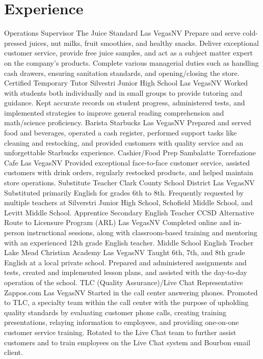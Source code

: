 \documentclass[11pt]{moderncv}
\title{}
\begin{document}
\maketitle
\section{Experience}
			{Operations Supervisor}
			{The Juice Standard}
			{Las Vegas}{NV}
			{Prepare and serve cold-pressed juices, nut milks, fruit smoothies, and healthy snacks. Deliver exceptional customer service, provide free juice samples, and act as a subject matter expert on the company's products. Complete various managerial duties such as handling cash drawers, ensuring sanitation standards, and opening/closing the store.}
			{Certified Temporary Tutor}
			{Silvestri Junior High School}
			{Las Vegas}{NV}
			{Worked with students both individually and in small groups to provide tutoring and guidance. Kept accurate records on student progress, administered tests, and implemented strategies to improve general reading comprehension and math/science proficiency.}
			{Barista}
			{Starbucks}
			{Las Vegas}{NV}
			{Prepared and served food and beverages, operated a cash register, performed support tasks like cleaning and restocking, and provided customers with quality service and an unforgettable Starbucks experience.}
			{Cashier/Food Prep}
			{Sambalatte Torrefazione Cafe}
			{Las Vegas}{NV}
			{Provided  exceptional face-to-face  customer service, assisted customers with drink orders, regularly restocked products, and helped maintain store operations.}
			{Substitute Teacher}
			{Clark County School District}
			{Las Vegas}{NV}
			{Substituted primarily English for grades 6th to 8th. Frequently requested by multiple teachers at Silverstri Junior High School, Schofield Middle School, and Levitt Middle School.}
			{Apprentice Secondary English Teacher}
			{CCSD Alternative Route to Licensure Program (ARL)}
			{Las Vegas}{NV}
			{Completed online and in-person instructional sessions, along with classroom-based training and mentoring with an experienced 12th grade English teacher.}
			{Middle School English Teacher}
			{Lake Mead Christian Academy}
			{Las Vegas}{NV}
			{Taught 6th, 7th, and 8th grade English at a local private school. Prepared and administered assignments and tests, created and implemented lesson plans, and assisted with the day-to-day operation of the school.}
			{TLC (Quality Assurance)/Live Chat Representative}
			{Zappos.com}
			{Las Vegas}{NV}
			{Started in the call center answering phones. Promoted to TLC, a specialty team within the call center with the purpose of upholding quality standards by evaluating customer phone calls, creating training presentations, relaying information to employees, and providing one-on-one customer service training. Rotated to the Live Chat team to further assist customers and to train employees on the Live Chat system and Bourbon email client.}
\end{document}
